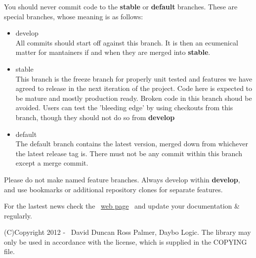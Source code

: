 \documentclass{article}
\begin{document}
You should never commit code to the \textbf{stable} or \textbf{default} branches.  These are special
branches, whose meaning is as follows:

\begin{itemize}
\item develop
\\
All commits should start off against this branch.  It is then an ecumenical matter for mantainers
if and when they are merged into \textbf{stable}.
\item stable
\\
This branch is the freeze branch for properly unit tested and features we have agreed to release in
the next iteration of the project.  Code here is expected to be mature and mostly production ready.
Broken code in this branch shoud be avoided.  Users can test the 'bleeding edge' by using checkouts
from this branch, though they should not do so from \textbf{develop}
\item default
\\
The default branch contains the latest version, merged down from whichever the latest release tag is.
There must not be any commit within this branch except a merge commit.
\\
\end{itemize}

Please do not make named feature branches.  Always develop within \textbf{develop}, and use bookmarks
or additional repository clones for separate features.

\par For the lastest news check the~ \href{http://bitbucket.org/daybologic/dlpodget}{web
page}~ and update your documentation \& regularly.


\par (C)Copyright 2012 -
\the\year
~David Duncan Ross Palmer, Daybo Logic. The library may only be used in accordance
with
the license, which is supplied in the COPYING file.\\
\end{document}
